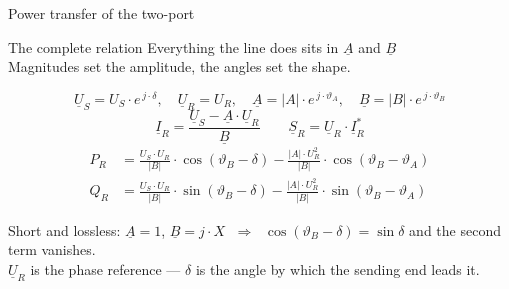 %

\begin{frame}{Power transfer of the two-port}
  \begin{block}{The complete relation}
    {Everything the line does sits in $\underline{A}$ and $\underline{B}$\\
    Magnitudes set the amplitude, the angles set the shape.}
  \end{block}

  \setlength{\abovedisplayskip}{3pt}\setlength{\belowdisplayskip}{4pt}
  \[
    \underline{U}_S = U_S\cdot e^{\,j\cdot\delta}, \quad
    \underline{U}_R = U_R, \quad
    \underline{A} = \left|A\right|\cdot e^{\,j\cdot\vartheta_A}, \quad
    \underline{B} = \left|B\right|\cdot e^{\,j\cdot\vartheta_B}
  \]
  \[
    \underline{I}_R = \frac{\underline{U}_S - \underline{A}\cdot\underline{U}_R}
                           {\underline{B}}
    \qquad
    \underline{S}_R = \underline{U}_R\cdot\underline{I}_R^{*}
  \]
  {\footnotesize
  \[
    \begin{aligned}
      P_R &= \frac{U_S\cdot U_R}{\left|B\right|}
             \cdot\cos\left(\vartheta_B-\delta\right)
           - \frac{\left|A\right|\cdot U_R^2}{\left|B\right|}
             \cdot\cos\left(\vartheta_B-\vartheta_A\right) \\[0.3em]
      Q_R &= \frac{U_S\cdot U_R}{\left|B\right|}
             \cdot\sin\left(\vartheta_B-\delta\right)
           - \frac{\left|A\right|\cdot U_R^2}{\left|B\right|}
             \cdot\sin\left(\vartheta_B-\vartheta_A\right)
    \end{aligned}
  \]}

  \centering
  {\footnotesize Short and lossless: $\underline{A}=1$,
  $\underline{B}=j\cdot X$ $\;\Rightarrow\;$
  $\cos\left(\vartheta_B-\delta\right)=\sin\delta$ and the second term
  vanishes.}\\[0.05em]
  {\color{atGray}\footnotesize $\underline{U}_R$ is the phase reference ---
  $\delta$ is the angle by which the sending end leads it.}
\end{frame}
